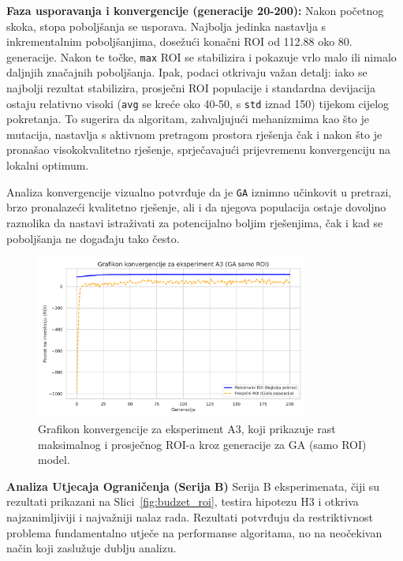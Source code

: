 \textbf{Faza usporavanja i konvergencije (generacije 20-200):} Nakon početnog skoka, stopa poboljšanja se usporava. Najbolja jedinka nastavlja s inkrementalnim poboljšanjima, dosežući konačni ROI od 112.88 oko 80. generacije. Nakon te točke, \texttt{max} ROI se stabilizira i pokazuje vrlo malo ili nimalo daljnjih značajnih poboljšanja. Ipak, podaci otkrivaju važan detalj: iako se najbolji rezultat stabilizira, prosječni ROI populacije i standardna devijacija ostaju relativno visoki (\texttt{avg} se kreće oko 40-50, s \texttt{std} iznad 150) tijekom cijelog pokretanja. To sugerira da algoritam, zahvaljujući mehanizmima kao što je mutacija, nastavlja s aktivnom pretragom prostora rješenja čak i nakon što je pronašao visokokvalitetno rješenje, sprječavajući prijevremenu konvergenciju na lokalni optimum.

Analiza konvergencije vizualno potvrđuje da je \texttt{GA} iznimno učinkovit u pretrazi, brzo pronalazeći kvalitetno rješenje, ali i da njegova populacija ostaje dovoljno raznolika da nastavi istraživati za potencijalno boljim rješenjima, čak i kad se poboljšanja ne događaju tako često.

\begin{figure}[H]    
\centering
\includegraphics[width=0.8\textwidth]{slike/grafikoni_final/E_konvergencija_A3.png}
\caption{Grafikon konvergencije za eksperiment A3, koji prikazuje rast maksimalnog i prosječnog ROI-a kroz generacije za GA (samo ROI) model.}
\label{fig:konvergencija_a3_samo_roi}
\end{figure}



\textbf{Analiza Utjecaja Ograničenja (Serija B)}
Serija B eksperimenata, čiji su rezultati prikazani na Slici~\ref{fig:budzet_roi}, testira hipotezu H3 i otkriva najzanimljiviji i najvažniji nalaz rada. Rezultati potvrđuju da restriktivnost problema fundamentalno utječe na performanse algoritama, no na neočekivan način koji zaslužuje dublju analizu.

